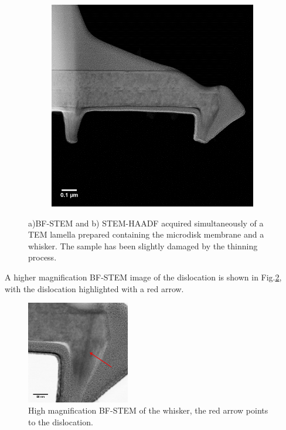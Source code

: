 \begin{figure}[h]
\begin{subfigure}[b]{0.48\textwidth}
	\end{subfigure}%
	\hspace*{0.5cm}
	\begin{subfigure}[b]{0.48\textwidth}
		\centering
		\includegraphics[width=0.86\linewidth]{Figs/Ch4/whiskDF}
		\caption{}
	\end{subfigure}%
	
	\caption{a)BF-STEM and b) STEM-HAADF acquired simultaneously of a TEM lamella prepared containing the microdisk membrane and a whisker. The sample has been slightly damaged by the thinning process.}
	\label{whiskerstem}
\end{figure}
\FloatBarrier

A higher magnification BF-STEM image of the dislocation is shown in Fig.\ref{whiskzoom}, with the dislocation highlighted with a red arrow.

\begin{figure}[h]
	\centering
	\includegraphics[width=0.4\textwidth]{Figs/Ch4/whiskclosebf}
	\caption {High magnification BF-STEM of the whisker, the red arrow points to the dislocation.}
	\label{whiskzoom}
\end{figure}
\FloatBarrier 

